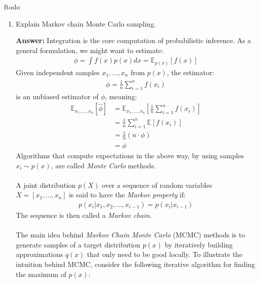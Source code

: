 ƒtodo\documentclass{article}
\newenvironment{QandA}{\begin{enumerate}[label=\arabic*.]}{\end{enumerate}}
\newenvironment{answer}{\par\normalfont \textbf{Answer:}}{}
\newcommand{\Exp}[1]{\mathbb{E}\left[ #1 \right]}
\newcommand{\g}{\vert}
\begin{document}
\begin{QandA}
\begin{answer}
        (Source: \href{https://web.ma.utexas.edu/users/parker/sampling/repl.htm}{University of Texas})
    \end{answer}

    \item Explain Markov chain Monte Carlo sampling.
    \begin{answer}
        Integration is the core computation of probabilistic inference. As a general formulation, we might want to estimate:
        \begin{align*}
            \phi = \int f(x) p(x) dx = \mathbb{E}_{p(x)} \left[ f(x) \right]
        \end{align*}
        Given independent samples $x_1, \ldots, x_n$ from $p(x)$, the estimator:
        \begin{align*}
            \hat{\phi} = \frac{1}{n} \sum_{i=1}^n f(x_i)
        \end{align*}
        is an unbiased estimator of $\phi$, meaning:
        \begin{align*}
            \mathbb{E}_{x_1, \ldots, x_n} \left[ \hat{\phi} \right] &= \mathbb{E}_{x_1, \ldots, x_n} \left[ \frac{1}{n} \sum_{i=1}^n f(x_i) \right] \\
            &= \frac{1}{n} \sum_{i=1}^n \Exp{f(x_i)} \\
            &= \frac{1}{n} (n \cdot \phi) \\
            &= \phi
        \end{align*}
        Algorithms that compute expectations in the above way, by using samples $x_i \sim p(x)$, are called \textit{Monte Carlo} methods. \\\\
        A joint distribution $p(X)$ over a sequence of random variables $X = \left[ x_1, \ldots, x_n \right]$ is said to have the \textit{Markov property} if:
        \begin{align*}
            p(x_i \g x_1, x_2, \ldots, x_{i-1}) = p(x_i \g x_{i-1})
        \end{align*}
        The sequence is then called a \textit{Markov chain}. \\\\
        The main idea behind \textit{Markov Chain Monte Carlo} (MCMC) methods is to generate samples of a target distribution $p(x)$ by iteratively building approximations $q(x)$ that only need to be good locally. To illustrate the intuition behind MCMC, consider the following iterative algorithm for finding the maximum of $p(x)$:
        \begin{itemize}

\end{itemize}
\end{answer}
\end{QandA}
\end{document}
